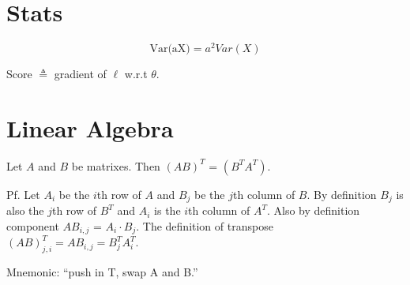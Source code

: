 \documentclass[12pt]{amsart}
\title{}
\author{}
\date{} %
\begin{document}
\maketitle
\tableofcontents

\section{Stats}

$$
\text{Var(aX)} = a^2 Var(X)
$$

Score $\triangleq$ gradient of $\ell$ w.r.t  $\theta$.

\section{Linear Algebra}

Let $A$ and $B$ be matrixes. Then $(AB)^T$ = $(B^T A^T)$. 

Pf. Let $A_i$ be the $i$th row of $A$ and $B_j$ be the $j$th column of $B$.  By definition $B_j$ is also the $j$th row of $B^T$ and $A_i$ is the $i$th column of $A^T$. Also by definition component $AB_{i,j}$ = $A_i \cdot B_j$. The definition of transpose $(AB)^T_{j,i} = AB_{i,j} = B^T_{j}A^T_i$.

Mnemonic: ``push in T, swap A and B.'' 
\end{document}
